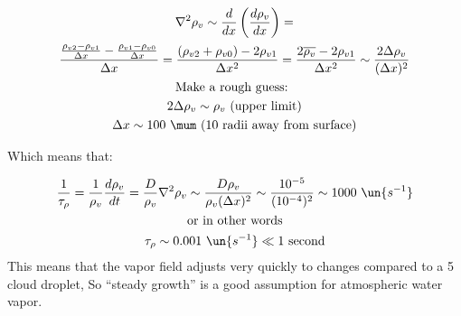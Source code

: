 \documentclass[12pt]{article}
\begin{document}
\begin{gather}
  \nabla^2 \rho_v \sim \frac{ d}{dx} \left( \frac{ d \rho_v}{dx} \right ) = \\
\frac{\frac{\rho_{v2} - \rho_{v1}}{\Delta x} - \frac{\rho_{v1} - \rho_{v0}}{\Delta x}}{\Delta x}
= \frac{(\rho_{v2} + \rho_{v0}) - 2 \rho_{v1}}{\Delta x^2} = \frac{2 \overline{\rho_{v}} - 2 \rho_{v1}}{\Delta x^2}   \sim \frac{2\Delta \rho_v }{(\Delta x)^2}  \\
\text{Make a rough guess: }\nonumber \\
2\Delta \rho_v \sim \rho_v\ \text{(upper limit)}\\
\Delta x \sim 100\ \mum \ \text{(10 radii away from surface)}\nonumber 
\end{gather}




Which means that:

\begin{gather}
 \frac{ 1}{\tau_\rho} = \frac{1 }{\rho_v} \frac{ d \rho_v}{dt} =  \frac{D }{\rho_v}  \nabla^2 \rho_v 
\sim \frac{ D \rho_v}{\rho_v (\Delta x)^2} \sim \frac{10^{-5}}{(10^{-4})^2} \sim 1000\ \un{s^{-1}}\\
\text{or in other words} \nonumber \\
\tau_\rho \sim 0.001\ \un{s^{-1}} \ll 1\ \text{second}
\end{gather}
This means that the vapor field adjusts very quickly to changes compared to a 5 \mum cloud droplet,
So ``steady growth'' is a good assumption for atmospheric water vapor.
\end{document}
